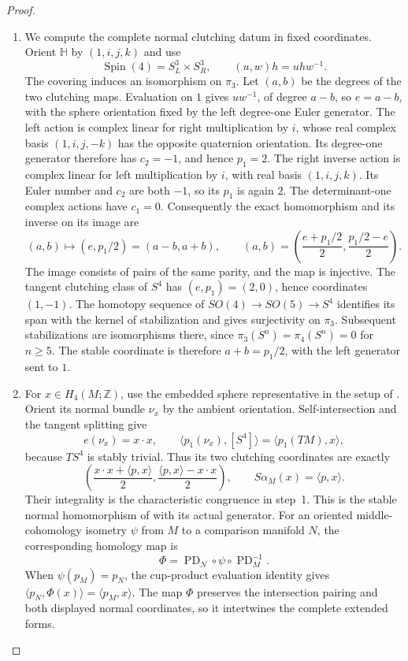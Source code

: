 \documentclass[11pt,a4paper]{article}
\theoremstyle{definition}
\begin{document}
\begin{proof}
\begin{enumerate}[label=\arabic*.]
\item We compute the complete normal clutching datum in fixed
coordinates. Orient $\mathbb H$ by $(1,i,j,k)$ and use
\[
\operatorname{Spin}(4)=S^3_L\times S^3_R,
\qquad (u,w)h=uhw^{-1}.
\]
The covering induces an isomorphism on $\pi_3$. Let $(a,b)$ be
the degrees of the two clutching maps. Evaluation on $1$ gives
$uw^{-1}$, of degree $a-b$, so $e=a-b$, with the sphere orientation
fixed by the left degree-one Euler generator. The left action is
complex linear for right multiplication by $i$, whose real complex
basis $(1,i,j,-k)$ has the opposite quaternion orientation. Its
degree-one generator therefore has $c_2=-1$, and hence $p_1=2$.
The right inverse action is complex linear for left multiplication
by $i$, with real basis $(1,i,j,k)$. Its Euler number and $c_2$ are
both $-1$, so its $p_1$ is again $2$. The determinant-one complex
actions have $c_1=0$. Consequently the exact homomorphism and its
inverse on its image are
\[
(a,b)\longmapsto(e,p_1/2)=(a-b,a+b),
\qquad
(a,b)=\left(\frac{e+p_1/2}{2},\frac{p_1/2-e}{2}\right).
\]
The image consists of pairs of the same parity, and the map is
injective. The tangent clutching class of $S^4$ has $(e,p_1)=(2,0)$,
hence coordinates $(1,-1)$. The homotopy sequence of
$SO(4)\to SO(5)\to S^4$ identifies its span with the kernel of
stabilization and gives surjectivity on $\pi_3$. Subsequent
stabilizations are isomorphisms there, since
$\pi_3(S^n)=\pi_4(S^n)=0$ for $n\geq5$.
The stable coordinate is therefore $a+b=p_1/2$, with the left
generator sent to $1$.

\item For $x\in H_4(M;\mathbb Z)$, use the embedded sphere
representative in the setup of
\cite[\S3.3, pp.~11--12]{IVVWallForm}. Orient its normal bundle
$\nu_x$ by the ambient orientation. Self-intersection and the
tangent splitting give
\[
e(\nu_x)=x\cdot x,\qquad
\langle p_1(\nu_x),[S^4]\rangle=\langle p_1(TM),x\rangle,
\]
because $TS^4$ is stably trivial. Thus its two clutching coordinates
are exactly
\[
\left(\frac{x\cdot x+\langle p,x\rangle}{2},
      \frac{\langle p,x\rangle-x\cdot x}{2}\right),
\qquad S\alpha_M(x)=\langle p,x\rangle.
\]
Their integrality is the characteristic congruence in step~1.
This is the stable normal homomorphism of
\cite[Definition~3.6, p.~12]{IVVWallForm} with its actual generator.
For an oriented middle-cohomology isometry $\psi$ from $M$ to a
comparison manifold $N$, the corresponding homology map is
\[
\Phi=\operatorname{PD}_N\circ\psi\circ\operatorname{PD}_M^{-1}.
\]
When $\psi(p_M)=p_N$, the cup-product evaluation identity gives
$\langle p_N,\Phi(x)\rangle=\langle p_M,x\rangle$.
The map $\Phi$ preserves the intersection pairing and both displayed
normal coordinates, so it intertwines the complete extended forms.


\end{enumerate}
\end{proof}
\end{document}
